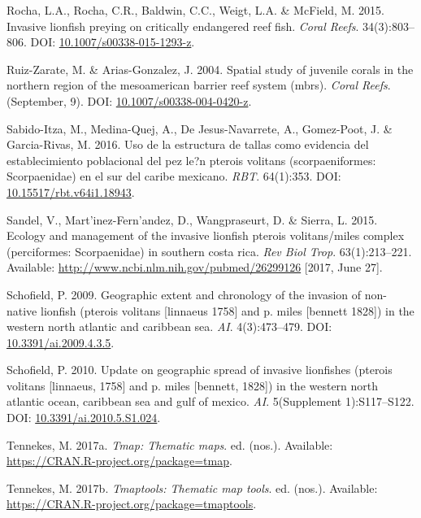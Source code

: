 \documentclass[12pt,]{article}
\begin{document}
\hypertarget{ref-rocha_2015}{}
Rocha, L.A., Rocha, C.R., Baldwin, C.C., Weigt, L.A. \& McField, M.
2015. Invasive lionfish preying on critically endangered reef fish.
\emph{Coral Reefs}. 34(3):803--806. DOI:
\href{https://doi.org/10.1007/s00338-015-1293-z}{10.1007/s00338-015-1293-z}.

\hypertarget{ref-ruizzarate_2004}{}
Ruiz-Zarate, M. \& Arias-Gonzalez, J. 2004. Spatial study of juvenile
corals in the northern region of the mesoamerican barrier reef system
(mbrs). \emph{Coral Reefs}. (September, 9). DOI:
\href{https://doi.org/10.1007/s00338-004-0420-z}{10.1007/s00338-004-0420-z}.

\hypertarget{ref-sabidoitza_2016}{}
Sabido-Itza, M., Medina-Quej, A., De Jesus-Navarrete, A., Gomez-Poot, J.
\& Garcia-Rivas, M. 2016. Uso de la estructura de tallas como evidencia
del establecimiento poblacional del pez le?n pterois volitans
(scorpaeniformes: Scorpaenidae) en el sur del caribe mexicano.
\emph{RBT}. 64(1):353. DOI:
\href{https://doi.org/10.15517/rbt.v64i1.18943}{10.15517/rbt.v64i1.18943}.

\hypertarget{ref-sandel_2015}{}
Sandel, V., Mart\a'inez-Fern\a'andez, D., Wangpraseurt, D. \& Sierra, L.
2015. Ecology and management of the invasive lionfish pterois
volitans/miles complex (perciformes: Scorpaenidae) in southern costa
rica. \emph{Rev Biol Trop}. 63(1):213--221. Available:
\url{http://www.ncbi.nlm.nih.gov/pubmed/26299126} {[}2017, June 27{]}.

\hypertarget{ref-schofield_2009}{}
Schofield, P. 2009. Geographic extent and chronology of the invasion of
non-native lionfish (pterois volitans {[}linnaeus 1758{]} and p. miles
{[}bennett 1828{]}) in the western north atlantic and caribbean sea.
\emph{AI}. 4(3):473--479. DOI:
\href{https://doi.org/10.3391/ai.2009.4.3.5}{10.3391/ai.2009.4.3.5}.

\hypertarget{ref-schofield_2010}{}
Schofield, P. 2010. Update on geographic spread of invasive lionfishes
(pterois volitans {[}linnaeus, 1758{]} and p. miles {[}bennett, 1828{]})
in the western north atlantic ocean, caribbean sea and gulf of mexico.
\emph{AI}. 5(Supplement 1):S117--S122. DOI:
\href{https://doi.org/10.3391/ai.2010.5.S1.024}{10.3391/ai.2010.5.S1.024}.

\hypertarget{ref-tmap_2017}{}
Tennekes, M. 2017a. \emph{Tmap: Thematic maps}. ed. (nos.). Available:
\url{https://CRAN.R-project.org/package=tmap}.

\hypertarget{ref-tmaptools_2017}{}
Tennekes, M. 2017b. \emph{Tmaptools: Thematic map tools}. ed. (nos.).
Available: \url{https://CRAN.R-project.org/package=tmaptools}.
\end{document}
